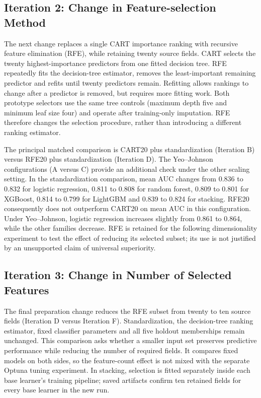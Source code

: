 \subsection{Iteration 2: Change in Feature-selection Method}
The next change replaces a single CART importance ranking with recursive feature elimination (RFE), while retaining twenty source fields. CART selects the twenty highest-importance predictors from one fitted decision tree. RFE repeatedly fits the decision-tree estimator, removes the least-important remaining predictor and refits until twenty predictors remain. Refitting allows rankings to change after a predictor is removed, but requires more fitting work. Both prototype selectors use the same tree controls (maximum depth five and minimum leaf size four) and operate after training-only imputation. RFE therefore changes the selection procedure, rather than introducing a different ranking estimator.

The principal matched comparison is CART20 plus standardization (Iteration B) versus RFE20 plus standardization (Iteration D). The Yeo--Johnson configurations (A versus C) provide an additional check under the other scaling setting. In the standardization comparison, mean AUC changes from 0.836 to 0.832 for logistic regression, 0.811 to 0.808 for random forest, 0.809 to 0.801 for XGBoost, 0.814 to 0.799 for LightGBM and 0.839 to 0.824 for stacking. RFE20 consequently does not outperform CART20 on mean AUC in this configuration. Under Yeo--Johnson, logistic regression increases slightly from 0.861 to 0.864, while the other families decrease. RFE is retained for the following dimensionality experiment to test the effect of reducing its selected subset; its use is not justified by an unsupported claim of universal superiority.

\subsection{Iteration 3: Change in Number of Selected Features}
The final preparation change reduces the RFE subset from twenty to ten source fields (Iteration D versus Iteration F). Standardization, the decision-tree ranking estimator, fixed classifier parameters and all five holdout memberships remain unchanged. This comparison asks whether a smaller input set preserves predictive performance while reducing the number of required fields. It compares fixed models on both sides, so the feature-count effect is not mixed with the separate Optuna tuning experiment. In stacking, selection is fitted separately inside each base learner's training pipeline; saved artifacts confirm ten retained fields for every base learner in the new run.


